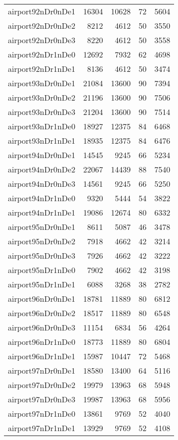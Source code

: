 \begin{longtable}{lrrrr}
airport92nDr0nDe1 & 16304 & 10628 & 72 & 5604 \\
airport92nDr0nDe2 & 8212 & 4612 & 50 & 3550 \\
airport92nDr0nDe3 & 8220 & 4612 & 50 & 3558 \\
airport92nDr1nDe0 & 12692 & 7932 & 62 & 4698 \\
airport92nDr1nDe1 & 8136 & 4612 & 50 & 3474 \\
airport93nDr0nDe1 & 21084 & 13600 & 90 & 7394 \\
airport93nDr0nDe2 & 21196 & 13600 & 90 & 7506 \\
airport93nDr0nDe3 & 21204 & 13600 & 90 & 7514 \\
airport93nDr1nDe0 & 18927 & 12375 & 84 & 6468 \\
airport93nDr1nDe1 & 18935 & 12375 & 84 & 6476 \\
airport94nDr0nDe1 & 14545 & 9245 & 66 & 5234 \\
airport94nDr0nDe2 & 22067 & 14439 & 88 & 7540 \\
airport94nDr0nDe3 & 14561 & 9245 & 66 & 5250 \\
airport94nDr1nDe0 & 9320 & 5444 & 54 & 3822 \\
airport94nDr1nDe1 & 19086 & 12674 & 80 & 6332 \\
airport95nDr0nDe1 & 8611 & 5087 & 46 & 3478 \\
airport95nDr0nDe2 & 7918 & 4662 & 42 & 3214 \\
airport95nDr0nDe3 & 7926 & 4662 & 42 & 3222 \\
airport95nDr1nDe0 & 7902 & 4662 & 42 & 3198 \\
airport95nDr1nDe1 & 6088 & 3268 & 38 & 2782 \\
airport96nDr0nDe1 & 18781 & 11889 & 80 & 6812 \\
airport96nDr0nDe2 & 18517 & 11889 & 80 & 6548 \\
airport96nDr0nDe3 & 11154 & 6834 & 56 & 4264 \\
airport96nDr1nDe0 & 18773 & 11889 & 80 & 6804 \\
airport96nDr1nDe1 & 15987 & 10447 & 72 & 5468 \\
airport97nDr0nDe1 & 18580 & 13400 & 64 & 5116 \\
airport97nDr0nDe2 & 19979 & 13963 & 68 & 5948 \\
airport97nDr0nDe3 & 19987 & 13963 & 68 & 5956 \\
airport97nDr1nDe0 & 13861 & 9769 & 52 & 4040 \\
airport97nDr1nDe1 & 13929 & 9769 & 52 & 4108 \\

\end{longtable}
